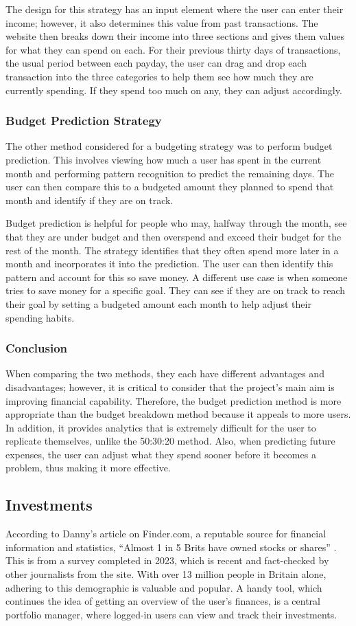 The design for this strategy has an input element where the user can enter their income; however, it also determines this value from past transactions. The website then breaks down their income into three sections and gives them values for what they can spend on each. For their previous thirty days of transactions, the usual period between each payday, the user can drag and drop each transaction into the three categories to help them see how much they are currently spending. If they spend too much on any, they can adjust accordingly.

\subsubsection{Budget Prediction Strategy}
The other method considered for a budgeting strategy was to perform budget prediction. This involves viewing how much a user has spent in the current month and performing pattern recognition to predict the remaining days. The user can then compare this to a budgeted amount they planned to spend that month and identify if they are on track.

Budget prediction is helpful for people who may, halfway through the month, see that they are under budget and then overspend and exceed their budget for the rest of the month. The strategy identifies that they often spend more later in a month and incorporates it into the prediction. The user can then identify this pattern and account for this so save money. A different use case is when someone tries to save money for a specific goal. They can see if they are on track to reach their goal by setting a budgeted amount each month to help adjust their spending habits.

\subsubsection{Conclusion}
When comparing the two methods, they each have different advantages and disadvantages; however, it is critical to consider that the project's main aim is improving financial capability. Therefore, the budget prediction method is more appropriate than the budget breakdown method because it appeals to more users. In addition, it provides analytics that is extremely difficult for the user to replicate themselves, unlike the 50:30:20 method. Also, when predicting future expenses, the user can adjust what they spend sooner before it becomes a problem, thus making it more effective.

\subsection{Investments}
According to Danny's article on Finder.com, a reputable source for financial information and statistics, ``Almost 1 in 5 Brits have owned stocks or shares'' \cite{InvestmentStats}. This is from a survey completed in 2023, which is recent and fact-checked by other journalists from the site. With over 13 million people in Britain alone, adhering to this demographic is valuable and popular. A handy tool, which continues the idea of getting an overview of the user's finances, is a central portfolio manager, where logged-in users can view and track their investments.

